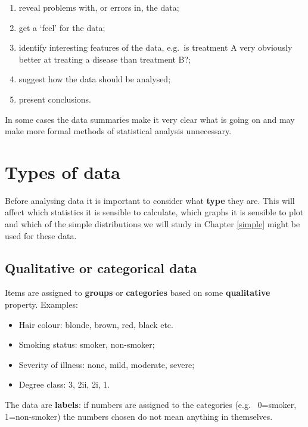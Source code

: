 \documentclass[
  11pt,
  british,
  openany, a4paper]{book}
\providecommand{\tightlist}{%
  \setlength{\itemsep}{0pt}\setlength{\parskip}{0pt}}
\begin{document}
\begin{enumerate}
\def\labelenumi{\arabic{enumi}.}
\tightlist
\item
  reveal problems with, or errors in, the data;
\item
  get a `feel' for the data;
\item
  identify interesting features of the data, e.g.~is treatment A very
  obviously better at treating a disease than treatment B?;
\item
  suggest how the data should be analysed;
\item
  present conclusions.
\end{enumerate}

In some cases the data summaries make it very clear what is going on and may
make more formal methods of statistical analysis unnecessary.

\hypertarget{types-of-data}{%
\section{Types of data}\label{types-of-data}}

Before analysing data it is important to consider what \textbf{type} they are. This will affect which statistics it is sensible to calculate, which graphs it is sensible to plot and which of the simple distributions we will study in Chapter \ref{simple} might be used for these data.

\hypertarget{qualitative-or-categorical-data}{%
\subsection{Qualitative or categorical data}\label{qualitative-or-categorical-data}}

Items are assigned to \textbf{groups} or \textbf{categories} based on some \textbf{qualitative} property. Examples:

\begin{itemize}
\tightlist
\item
  Hair colour: blonde, brown, red, black etc.
\item
  Smoking status: smoker, non-smoker;
\item
  Severity of illness: none, mild, moderate, severe;
\item
  Degree class: 3, 2ii, 2i, 1.
\end{itemize}

The data are \textbf{labels}: if numbers are assigned to the categories (e.g.~
0=smoker, 1=non-smoker) the numbers chosen do not mean anything in themselves.
\end{document}
